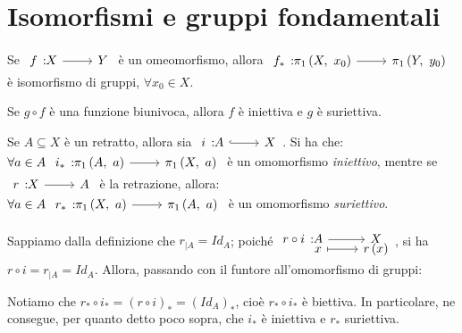 \section{Isomorfismi e gruppi fondamentali}
\begin{corollary}
	Se $\funz{f}{X}{Y}$ è un omeomorfismo, allora $\funz{f_{\ast}}{\gruf{X}{x_0}}{\gruf{Y}{y_0}}$ è isomorfismo di gruppi, $\forall x_0\in X$.
\end{corollary}
\begin{remember}
	Se $g\circ f$ è una funzione biunivoca, allora $f$ è iniettiva e $g$ è suriettiva.
\end{remember}
\begin{corollary} \label{grp fond iniettiva e suriettiva}
	Se $A\subseteq X$ è un retratto, allora sia $\incl{i}{A}{X}$. Si ha che:\\
	$\forall a\in A\ \funz{i_{\ast}}{\gruf{A}{a}}{\gruf{X}{a}}$ è un omomorfismo \textit{iniettivo}, mentre se $\funz{r}{X}{A}$ è la retrazione, allora:\\
	$\forall a\in A\ \funz{r_{\ast}}{\gruf{X}{a}}{\gruf{A}{a}}$ è un omomorfismo \textit{suriettivo}.
\end{corollary}
\begin{demonstration}
	Sappiamo dalla definizione che $r_{\mid A}=Id_A$; poiché $\funztot{r\circ i}{A}{X}{x}{r\left(x\right)}$, si ha $r\circ i=r_{\mid A}=Id_A$. Allora, passando con il funtore all'omomorfismo di gruppi:
	\begin{center}
	\end{center}
Notiamo che $r_{\ast}\circ i_{\ast}=\left(r\circ i\right)_{\ast}=\left(Id_A\right)_{\ast}$, cioè $r_{\ast}\circ i_{\ast}$ è biettiva. In particolare, ne consegue, per quanto detto poco sopra, che $i_{\ast}$ è iniettiva e $r_{\ast}$ suriettiva.
\end{demonstration}
